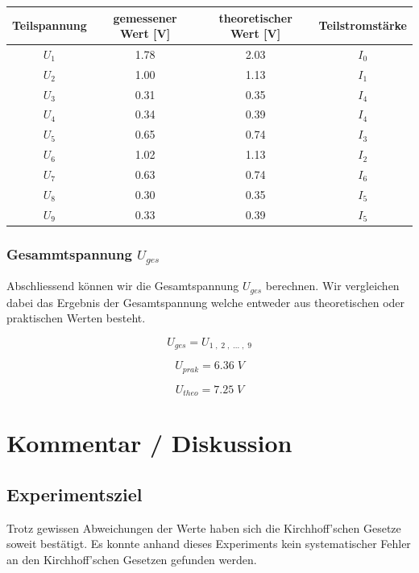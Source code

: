 \documentclass[a4paper,12pt]{article}
\begin{document}
\begin{table}[H]
\centering
    \begin{tabular}{|c|c|c|c|}
        \hline
        \textbf{Teilspannung} & \textbf{gemessener Wert [V]} & \textbf{theoretischer Wert [V]} & \textbf{Teilstromstärke}\\
        \hline
        $U_1$ & 1.78 & 2.03 & $I_0$\\
        \hline
        $U_2$ & 1.00 & 1.13 & $I_1$\\
        \hline
        $U_3$ & 0.31 & 0.35 & $I_4$\\
        \hline
        $U_4$ & 0.34 & 0.39 & $I_4$\\
        \hline
        $U_5$ & 0.65 & 0.74 & $I_3$\\
        \hline
        $U_6$ & 1.02 & 1.13 & $I_2$\\
        \hline
        $U_7$ & 0.63 & 0.74 & $I_6$\\
        \hline
        $U_8$ & 0.30 & 0.35 & $I_5$\\
        \hline
        $U_9$ & 0.33 & 0.39 & $I_5$\\
        \hline
    \end{tabular}
\end{table}

\subsubsection{Gesammtspannung $U_{ges}$}

Abschliessend können wir die Gesamtspannung $U_{ges}$ berechnen. Wir vergleichen dabei das Ergebnis der Gesamtspannung welche entweder aus theoretischen oder praktischen Werten besteht.

$$U_{ges} = U_{1\;,\;2\;,\; ...\;,\; 9}$$

$$U_{prak} = 6.36\; V$$

$$U_{theo} = 7.25\; V$$

\section{Kommentar / Diskussion}

\subsection{Experimentsziel}

Trotz gewissen Abweichungen der Werte haben sich die Kirchhoff'schen Gesetze soweit bestätigt. Es konnte anhand dieses Experiments kein systematischer Fehler an den Kirchhoff'schen Gesetzen gefunden werden.
\end{document}
